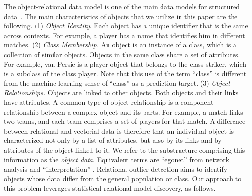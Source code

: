 \documentclass[conference]{IEEEtran}
\begin{document}
The object-relational data model is one of the main data models for structured data~\cite{Koller1997}. The main 
characteristics of objects that we utilize in this paper are the following. (1) {\em Object Identity.} Each object has a unique identifier that is the same across contexts. For example, a player has a name that identifies him in different matches. (2) {\em Class Membership.} An object is an instance of a class, which is a collection of similar objects. Objects in the same class share a set of attributes. For example, van Persie is a player object that belongs to the class striker, which is a subclass of the  class player. Note that this use of the term ``class'' is different from the machine learning sense of ``class'' as a prediction target. (3) {\em Object Relationships.} Objects are linked  to other objects. Both objects and their links have attributes. A common type of object relationship is a component relationship between a complex object and its parts.
For example, a match links two teams, and each team comprises a set of players for that match. A difference between relational and vectorial data is therefore that an individual object is characterized not only by a list of attributes, but also by its links and by attributes of the object linked to it. We refer to the substructure comprising this information as the {\em object data}. Equivalent terms are ``egonet'' from network analysis \cite{Akoglu2015} and ``interpretation'' \cite{Maervoet2012}. Relational outlier detection aims to identify objects whose data differ from the general population or class. Our approach to this problem leverages statistical-relational model discovery, as follows.
\end{document}
